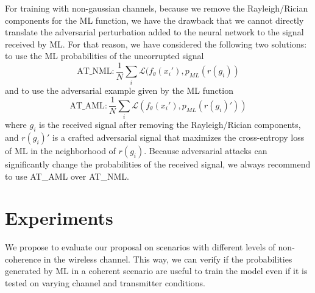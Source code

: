 \documentclass[conference]{IEEEtran}
\newcommand{\pf}[1]{{\textcolor{orange}{PF: {#1}}}}
\newcommand{\Ls}{\mathcal{L}}
\begin{document}
For training with non-gaussian channels, because we remove the Rayleigh/Rician components for the ML function, we have the drawback that we cannot directly translate the adversarial perturbation added to the neural network to the signal received by ML. For that reason, we have considered the following two solutions: to use the ML probabilities of the uncorrupted signal
\begin{equation}
    \text{AT\_NML} : \dfrac{1}{N}\sum_{i}\Ls(f_{\theta}(x_i'), p_{ML}(r(g_i))
\label{eq:at_nml}
\end{equation}
and to use the adversarial example given by the ML function
\begin{equation}
    \text{AT\_AML} : \dfrac{1}{N}\sum_{i}\Ls(f_{\theta}(x_i'), p_{ML}(r(g_i)'))
	\label{eq:at_aml}
\end{equation}
where $g_i$ is the received signal after removing the Rayleigh/Rician components, and $r(g_i)'$ is a crafted adversarial signal that maximizes the cross-entropy loss of ML in the neighborhood of $r(g_i)$.
Because adversarial attacks can significantly change the probabilities of the received signal, we always recommend to use AT\_AML over AT\_NML.


\section{Experiments}
\label{sec:experiments}



We propose to evaluate our proposal on scenarios with different levels of non-coherence in the wireless channel. This way, we can verify if the probabilities generated by ML in a coherent scenario are useful to train the model even if it is tested on varying channel and transmitter conditions. 
\end{document}
